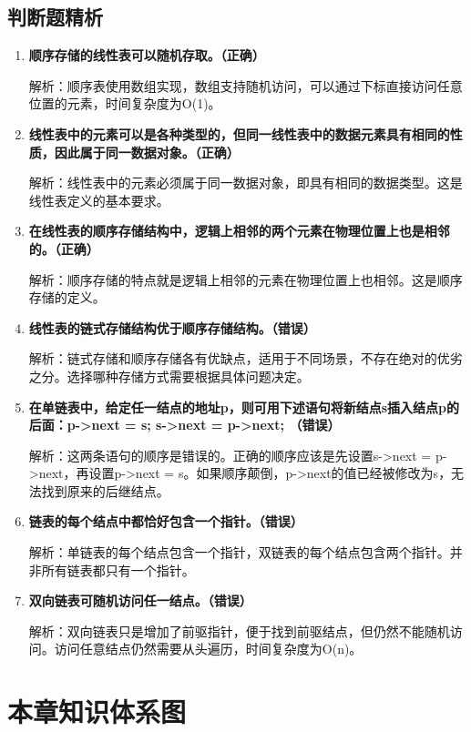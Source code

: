 \documentclass[12pt, a4paper]{article}
\begin{document}
\subsection{判断题精析}

\begin{enumerate}
	\item \textbf{顺序存储的线性表可以随机存取。（正确）}

	      解析：顺序表使用数组实现，数组支持随机访问，可以通过下标直接访问任意位置的元素，时间复杂度为O(1)。

	\item \textbf{线性表中的元素可以是各种类型的，但同一线性表中的数据元素具有相同的性质，因此属于同一数据对象。（正确）}

	      解析：线性表中的元素必须属于同一数据对象，即具有相同的数据类型。这是线性表定义的基本要求。

	\item \textbf{在线性表的顺序存储结构中，逻辑上相邻的两个元素在物理位置上也是相邻的。（正确）}

	      解析：顺序存储的特点就是逻辑上相邻的元素在物理位置上也相邻。这是顺序存储的定义。

	\item \textbf{线性表的链式存储结构优于顺序存储结构。（错误）}

	      解析：链式存储和顺序存储各有优缺点，适用于不同场景，不存在绝对的优劣之分。选择哪种存储方式需要根据具体问题决定。

	\item \textbf{在单链表中，给定任一结点的地址p，则可用下述语句将新结点s插入结点p的后面：p->next = s; s->next = p->next; （错误）}

	      解析：这两条语句的顺序是错误的。正确的顺序应该是先设置s->next = p->next，再设置p->next = s。如果顺序颠倒，p->next的值已经被修改为s，无法找到原来的后继结点。

	\item \textbf{链表的每个结点中都恰好包含一个指针。（错误）}

	      解析：单链表的每个结点包含一个指针，双链表的每个结点包含两个指针。并非所有链表都只有一个指针。

	\item \textbf{双向链表可随机访问任一结点。（错误）}

	      解析：双向链表只是增加了前驱指针，便于找到前驱结点，但仍然不能随机访问。访问任意结点仍然需要从头遍历，时间复杂度为O(n)。
\end{enumerate}

\section{本章知识体系图}
\end{document}
